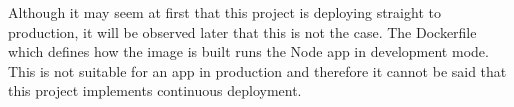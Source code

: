 	Although it may seem at first that this project is deploying straight to production, it will be observed later that this is not the case. The Dockerfile which defines how the image is built runs the Node app in development mode. This is not suitable for an app in production and therefore it cannot be said that this project implements continuous deployment.